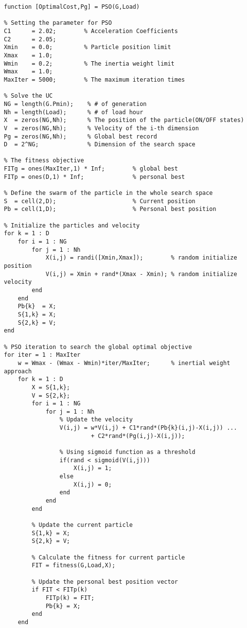 \begin{verbatim}
function [OptimalCost,Pg] = PSO(G,Load)

% Setting the parameter for PSO
C1      = 2.02;        % Acceleration Coefficients
C2      = 2.05;
Xmin    = 0.0;         % Particle position limit
Xmax    = 1.0;
Wmin    = 0.2;         % The inertia weight limit
Wmax    = 1.0;
MaxIter = 5000;        % The maximum iteration times

% Solve the UC
NG = length(G.Pmin);    % # of generation
Nh = length(Load);      % # of load hour
X  = zeros(NG,Nh);      % The position of the particle(ON/OFF states)
V  = zeros(NG,Nh);      % Velocity of the i-th dimension
Pg = zeros(NG,Nh);      % Global best record
D  = 2^NG;              % Dimension of the search space

% The fitness objective
FITg = ones(MaxIter,1) * Inf;        % global best
FITp = ones(D,1) * Inf;              % personal best

% Define the swarm of the particle in the whole search space
S  = cell(2,D);                      % Current position
Pb = cell(1,D);                      % Personal best position

% Initialize the particles and velocity
for k = 1 : D
    for i = 1 : NG
        for j = 1 : Nh
            X(i,j) = randi([Xmin,Xmax]);        % random initialize position
            V(i,j) = Xmin + rand*(Xmax - Xmin); % random initialize velocity
        end
    end
    Pb{k}  = X;
    S{1,k} = X;
    S{2,k} = V;
end

% PSO iteration to search the global optimal objective
for iter = 1 : MaxIter
    w = Wmax - (Wmax - Wmin)*iter/MaxIter;      % inertial weight approach
    for k = 1 : D
        X = S{1,k};
        V = S{2,k};
        for i = 1 : NG
            for j = 1 : Nh
                % Update the velocity
                V(i,j) = w*V(i,j) + C1*rand*(Pb{k}(i,j)-X(i,j)) ... 
                         + C2*rand*(Pg(i,j)-X(i,j));

                % Using sigmoid function as a threshold
                if(rand < sigmoid(V(i,j)))
                    X(i,j) = 1;
                else
                    X(i,j) = 0;
                end
            end
        end

        % Update the current particle
        S{1,k} = X;
        S{2,k} = V;

        % Calculate the fitness for current particle
        FIT = fitness(G,Load,X);

        % Update the personal best position vector
        if FIT < FITp(k)
            FITp(k) = FIT;
            Pb{k} = X;
        end
    end


\end{verbatim}
